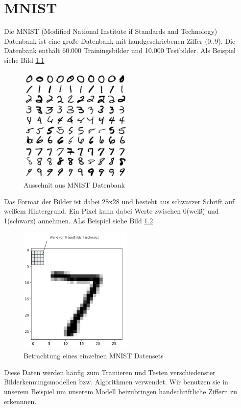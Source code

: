 \chapter{MNIST}

Die MNIST (Modified National Institute if Standards and Technology) Datenbank ist eine große Datenbank mit handgeschriebenen Ziffer (0..9). Die Datenbank enthält 60.000 Trainingsbilder und 10.000 Testbilder. Als Beispiel siehe Bild \ref{fig:MNIST_multi}
\begin{figure}[!ht]
\centering
\includegraphics[width=0.5\textwidth]{images/MNIST_multi}
\caption{Ausschnit aus MNIST Datenbank}
\label{fig:MNIST_multi}
\end{figure}

Das Format der Bilder ist dabei 28x28 und besteht aus schwarzer Schrift auf weißem Hintergrund. Ein Pixel kann dabei Werte zwischen 0(weiß) und 1(schwarz) annehmen. ALs Beispiel siehe Bild \ref{fig:MNIST_single}
\begin{figure}[!ht]
\centering
\includegraphics[width=0.5\textwidth]{images/MNIST_single}
\caption{Betrachtung eines einzelnen MNIST Datensets}
\label{fig:MNIST_single}
\end{figure}
Diese Daten werden häufig zum Trainieren und Testen verschiedenster Bilderkennungsmodellen bzw. Algorithmen verwendet. Wir benutzen sie in unserem Beispiel um unserem Modell beizubringen handschriftliche Ziffern zu erkennnen.

